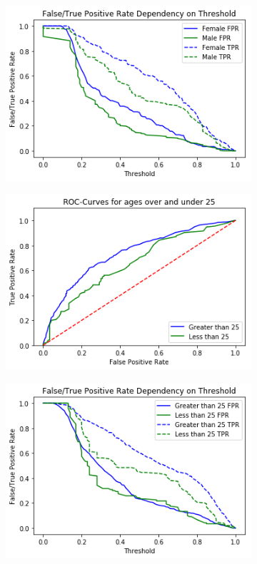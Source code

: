 \documentclass[11pt, fleqn, titlepage]{article}
\begin{document}
\begin{figure}[H]
\begin{subfigure}{0.5\textwidth}
		\end{subfigure}%
		\begin{subfigure}{0.5\textwidth}
			\centering
			\includegraphics[width=0.9\linewidth]{imgs/fpr_tpr_plot_sex.png}
		\end{subfigure}
		\begin{subfigure}{0.5\textwidth}
			\centering
			\includegraphics[width=0.9\linewidth]{imgs/ROC_age.png}
		\end{subfigure}%
		\begin{subfigure}{0.5\textwidth}
			\centering
			\includegraphics[width=0.9\linewidth]{imgs/fpr_tpr_plot_age.png}

\end{subfigure}
\end{figure}
\end{document}
